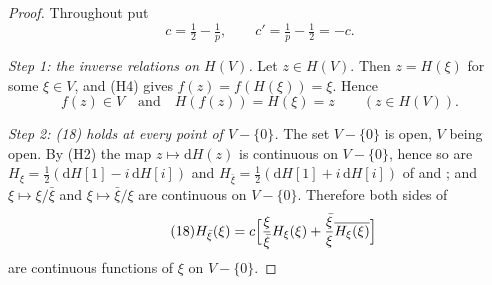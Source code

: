 \begin{proof}
Throughout put
\[
  c=\tfrac12-\tfrac1p,\qquad c'=\tfrac1p-\tfrac12=-c .
\]

\emph{Step 1: the inverse relations on $H(V)$.}  Let $z\in H(V)$.  Then
$z=H(\xi)$ for some $\xi\in V$, and (H4) gives $f(z)=f(H(\xi))=\xi$.  Hence
\begin{equation}\tag{1}
  f(z)\in V\quad\text{and}\quad H(f(z))=H(\xi)=z\qquad(z\in H(V)).
\end{equation}

\emph{Step 2: (18) holds at \emph{every} point of $V-\{0\}$.}  The set
$V-\{0\}$ is open, $V$ being open.  By (H2) the map $z\mapsto\mathrm{d}H(z)$ is
continuous on $V-\{0\}$, hence so are
$H_\xi=\tfrac12(\mathrm{d}H[1]-i\,\mathrm{d}H[i])$ and
$H_{\bar\xi}=\tfrac12(\mathrm{d}H[1]+i\,\mathrm{d}H[i])$ of  and
; and $\xi\mapsto\xi/\bar\xi$ and $\xi\mapsto\bar\xi/\xi$ are
continuous on $V-\{0\}$.  Therefore both sides of
\begin{equation}\tag{18}
  H_{\bar\xi}(\xi)=c\Bigl[\frac{\xi}{\bar\xi}H_\xi(\xi)
    +\frac{\bar\xi}{\xi}\overline{H_\xi(\xi)}\Bigr]
\end{equation}
are continuous functions of $\xi$ on $V-\{0\}$.


\end{proof}
